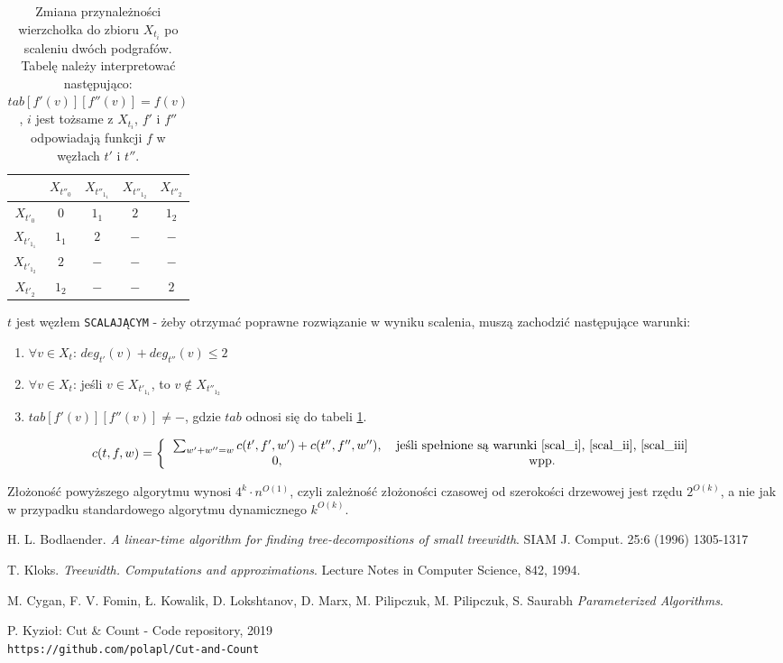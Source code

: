 \documentclass[12pt, oneside]{report}
\newcommand\Omicron{O}
\begin{document}
\begin{table}
\centering
\begin{tabular}{c|c|c|c|c}
 & $X_{t''_0}$ & $X_{t''_{1_1}}$ & $X_{t''_{1_2}}$ & $X_{t''_2}$ \\
\hline
$X_{t'_0}$ & $0$ & $1_1$ & $2$ & $1_2$ \\
\hline
$X_{t'_{1_1}}$ & $1_1$ & $2$ & $-$ & $-$ \\
\hline
$X_{t'_{1_2}}$ & $2$ & $-$ & $-$ & $-$ \\
\hline
$X_{t'_2}$ & $1_2$ & $-$ & $-$ & $2$ \\
\end{tabular}
\caption{Zmiana przynależności wierzchołka do zbioru $X_{t_i}$ po scaleniu dwóch podgrafów. Tabelę należy interpretować następująco: $tab[f'(v)][f''(v)] = f(v)$, $i$ jest tożsame z $X_{t_i}$, $f'$ i $f''$ odpowiadają funkcji $f$ w węzłach $t'$ i $t''$.}
\label{merge_table}
\end{table}
$$$$
$t$ jest węzłem \texttt{SCALAJĄCYM} - żeby otrzymać poprawne rozwiązanie w wyniku scalenia, muszą zachodzić następujące warunki:
\begin{enumerate}[label=(\roman*)]
\item \label{scal_i}$\forall v \in X_t$: $deg_{t'}(v) + deg_{t''}(v) \leq 2$
\item \label{scal_ii}$\forall v \in X_t$: jeśli $v \in X_{t'_{1_1}}$, to $v \notin X_{t''_{1_2}}$
\item \label{scal_iii}$tab[f'(v)][f''(v)] \neq -$, gdzie $tab$ odnosi się do tabeli \ref{merge_table}.
\end{enumerate}

\[
c(t,f,w) =  
\left \{
  \begin{tabular}{ccc}
  $\sum_{w' + w'' = w} c(t',f',w') + c(t'',f'',w'')$, & jeśli spełnione są warunki \ref{scal_i}, \ref{scal_ii}, \ref{scal_iii}\\
  0, & wpp. \\
  \end{tabular}
\right. 
\]

Złożoność powyższego algorytmu wynosi $4^k \cdot n^{\Omicron(1)}$, czyli zależność złożoności czasowej od szerokości drzewowej jest rzędu $2^{\Omicron(k)}$, a nie jak w przypadku standardowego algorytmu dynamicznego $k^{\Omicron(k)}$.

\newpage
	\begin{thebibliography}{9}
			H. L. Bodlaender. 
			\textit{A linear-time algorithm for finding tree-decompositions of small treewidth}. 
			SIAM J. Comput. 25:6 (1996) 1305-1317		
		
			T. Kloks. 
			\textit{Treewidth. Computations and approximations}. 
			Lecture Notes in Computer Science, 842, 1994.
			
			M. Cygan, F. V. Fomin, Ł. Kowalik, D. Lokshtanov, D. Marx, M. Pilipczuk, M. Pilipczuk, S. Saurabh
 			\textit{Parameterized Algorithms}.
 			
			P. Kyzioł: Cut \& Count - Code repository, 2019
			\\\texttt{https://github.com/polapl/Cut-and-Count}
	\end{thebibliography} 
\end{document}

